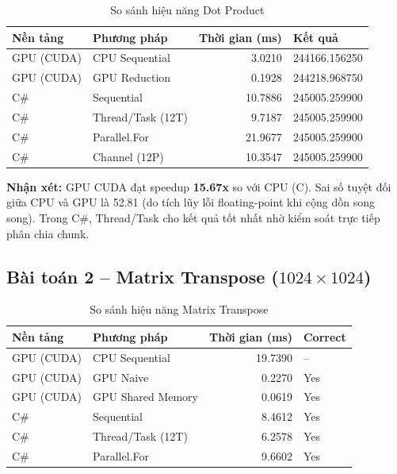 \documentclass[12pt,a4paper]{article}
\begin{document}
\begin{table}[H]
\centering
\caption{So sánh hiệu năng Dot Product}
\begin{tabular}{llrl}
\toprule
\textbf{Nền tảng} & \textbf{Phương pháp} & \textbf{Thời gian (ms)} & \textbf{Kết quả} \\
\midrule
GPU (CUDA)   & CPU Sequential     & 3.0210  & 244166.156250 \\
GPU (CUDA)   & GPU Reduction      & 0.1928  & 244218.968750 \\
\midrule
C\#          & Sequential         & 10.7886 & 245005.259900 \\
C\#          & Thread/Task (12T)  & 9.7187  & 245005.259900 \\
C\#          & Parallel.For       & 21.9677 & 245005.259900 \\
C\#          & Channel (12P)      & 10.3547 & 245005.259900 \\
\bottomrule
\end{tabular}
\end{table}

\textbf{Nhận xét:} GPU CUDA đạt speedup \textbf{15.67x} so với CPU (C). Sai số tuyệt đối giữa CPU và GPU là 52.81 (do tích lũy lỗi floating-point khi cộng dồn song song). Trong C\#, Thread/Task cho kết quả tốt nhất nhờ kiểm soát trực tiếp phân chia chunk.

\subsection{Bài toán 2 -- Matrix Transpose ($1024 \times 1024$)}

\begin{table}[H]
\centering
\caption{So sánh hiệu năng Matrix Transpose}
\begin{tabular}{llrl}
\toprule
\textbf{Nền tảng} & \textbf{Phương pháp} & \textbf{Thời gian (ms)} & \textbf{Correct} \\
\midrule
GPU (CUDA)   & CPU Sequential         & 19.7390  & -- \\
GPU (CUDA)   & GPU Naive              & 0.2270   & Yes \\
GPU (CUDA)   & GPU Shared Memory      & 0.0619   & Yes \\
\midrule
C\#          & Sequential             & 8.4612   & Yes \\
C\#          & Thread/Task (12T)      & 6.2578   & Yes \\
C\#          & Parallel.For           & 9.6602   & Yes \\
\bottomrule
\end{tabular}
\end{table}
\end{document}
